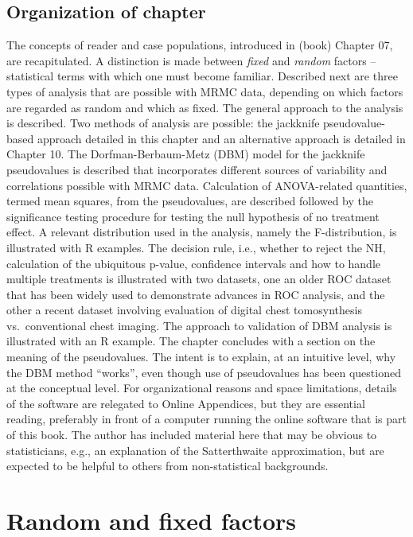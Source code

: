 \documentclass[
]{book}
\begin{document}
\hypertarget{organization-of-chapter}{%
\subsection{Organization of chapter}\label{organization-of-chapter}}

The concepts of reader and case populations, introduced in (book) Chapter 07, are recapitulated. A distinction is made between \emph{fixed} and \emph{random} factors -- statistical terms with which one must become familiar. Described next are three types of analysis that are possible with MRMC data, depending on which factors are regarded as random and which as fixed. The general approach to the analysis is described. Two methods of analysis are possible: the jackknife pseudovalue-based approach detailed in this chapter and an alternative approach is detailed in Chapter 10. The Dorfman-Berbaum-Metz (DBM) model for the jackknife pseudovalues is described that incorporates different sources of variability and correlations possible with MRMC data. Calculation of ANOVA-related quantities, termed mean squares, from the pseudovalues, are described followed by the significance testing procedure for testing the null hypothesis of no treatment effect. A relevant distribution used in the analysis, namely the F-distribution, is illustrated with R examples. The decision rule, i.e., whether to reject the NH, calculation of the ubiquitous p-value, confidence intervals and how to handle multiple treatments is illustrated with two datasets, one an older ROC dataset that has been widely used to demonstrate advances in ROC analysis, and the other a recent dataset involving evaluation of digital chest tomosynthesis vs.~conventional chest imaging. The approach to validation of DBM analysis is illustrated with an R example. The chapter concludes with a section on the meaning of the pseudovalues. The intent is to explain, at an intuitive level, why the DBM method ``works'', even though use of pseudovalues has been questioned at the conceptual level. For organizational reasons and space limitations, details of the software are relegated to Online Appendices, but they are essential reading, preferably in front of a computer running the online software that is part of this book. The author has included material here that may be obvious to statisticians, e.g., an explanation of the Satterthwaite approximation, but are expected to be helpful to others from non-statistical backgrounds.

\hypertarget{dbm-analysis-background-random-fixed-factors}{%
\section{Random and fixed factors}\label{dbm-analysis-background-random-fixed-factors}}
\end{document}

